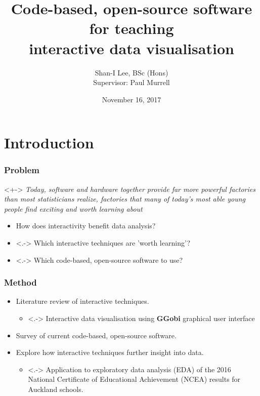 \documentclass{beamer}
\begin{document}
	\title{Code-based, open-source software for teaching \\ interactive data visualisation}
	
	\date{November 16, 2017}		
	\author{Shan-I Lee, BSc (Hons)\\ Supervisor: Paul Murrell}
	

		\titlepage

	
\section{Introduction}
\label{sec:introduction}
	
	\begin{frame}
		\frametitle{Problem}
		\begin{block}{\citet[p.~25]{Tukey}}<+->
			\textit{Today, software and hardware together provide far more powerful factories than most statisticians realize, factories that many of today's most able young people find exciting and worth learning about} 
		\end{block}
	\begin{itemize}[<+->]
		\item How does interactivity benefit data analysis?
		\item <.-> Which interactive techniques are 'worth learning'? 
		\item <.-> Which code-based, open-source software to use? 
	\end{itemize}
	\end{frame}

	\begin{frame}
		\frametitle{Method}
		\begin{itemize}[<+->]
			\item Literature review of interactive techniques.
			\begin{itemize}
				\item <.-> Interactive data visualisation using \textbf{GGobi} graphical user interface \citep{Cook}
			\end{itemize}
			\item Survey of current code-based, open-source software.
			\item Explore how interactive techniques further insight into data.
			\begin{itemize}
				\item <.-> Application to exploratory data analysis (EDA) of the 2016 National Certificate of Educational Achievement (NCEA) results for Auckland schools.
			\end{itemize}
		\end{itemize}
	\end{frame}
\end{document}
